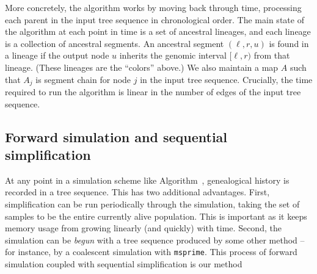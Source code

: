 \documentclass{article}
\newcommand{\msprime}{\texttt{msprime}}
\begin{document}
More concretely,
the algorithm works by moving back through time,
processing each parent in the input tree sequence in chronological order.
The main state of the algorithm at each point in time is a set of ancestral lineages,
and each lineage is a collection of ancestral segments.
An ancestral segment $(\ell, r, u)$ is found in a lineage
if the output node $u$ inherits the genomic interval $[\ell, r)$ from that lineage.
(These lineages are the ``colors'' above.)
We also maintain a map $A$ such that $A_j$ is segment chain for node $j$ in
the input tree sequence.
Crucially, the time required to run the algorithm is linear in the number of edges of the input tree sequence.

\subsection*{Forward simulation and sequential simplification}

At any point in a simulation scheme like Algorithm~, genealogical history is recorded
in a tree sequence. This has two additional advantages. First, simplification
can be run periodically through the simulation, taking the set of samples to be
the entire currently alive population. This is important as it keeps memory
usage from growing linearly (and quickly) with time. Second, the simulation can
be \emph{begun} with a tree sequence produced by some other method -- for
instance, by a coalescent simulation with \msprime. 
This process of forward simulation coupled with sequential simplification is our
method
\end{document}
